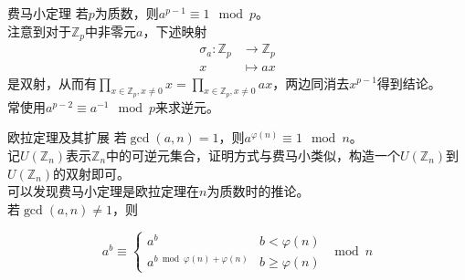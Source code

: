 \documentclass{beamer}
\begin{document}
\begin{frame}{费马小定理}
	若$p$为质数，则$a^{p-1} \equiv 1 \mod p$。
	\\
	
	注意到对于$\mathbb Z_p$中非零元$a$，下述映射\begin{align*}
		\sigma_a: \mathbb Z_p &\to \mathbb Z_p\\
		x &\mapsto ax
		\end{align*}
	是双射，从而有$\prod\limits_{x \in \mathbb Z_p, x \neq 0}x = \prod\limits_{x \in \mathbb Z_p, x \neq 0}ax$，两边同消去$x^{p-1}$得到结论。\\
	
	常使用$a^{p-2}\equiv a^{-1} \mod p$来求逆元。
\end{frame}
\begin{frame}{欧拉定理及其扩展}
	若$\gcd(a, n) = 1$，则$a^{\varphi(n)} \equiv 1 \mod n$。
	\\
	
	记$U(\mathbb Z_n)$表示$\mathbb Z_n$中的可逆元集合，证明方式与费马小类似，构造一个$U(\mathbb Z_n)$到$U(\mathbb Z_n)$的双射即可。\\
	
	可以发现费马小定理是欧拉定理在$n$为质数时的推论。
	\\
	
	若$\gcd(a,n)\neq 1$，则
	
	$$a^b\equiv\begin{cases}
		a^b &b < \varphi(n)\\
		a^{b \bmod \varphi(n)+\varphi(n)} &b \ge \varphi(n)
	\end{cases}
	\mod n$$
	
\end{frame}
\end{document}

